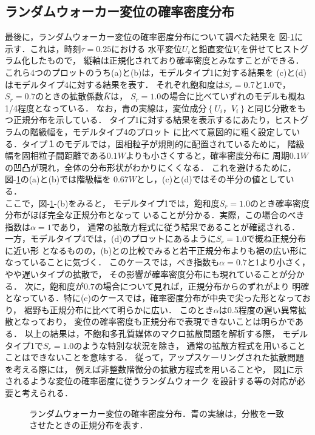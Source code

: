 \subsection{ランダムウォーカー変位の確率密度分布}
最後に，ランダムウォーカー変位の確率密度分布について調べた結果を
図-\ref{fig:fig10}に示す．これは，時刻$\tau=0.25$における
水平変位$U_i$と鉛直変位$V_i$を併せてヒストグラム化したもので，
縦軸は正規化されており確率密度とみなすことができる．
これら4つのプロットのうち(a)と(b)は，モデルタイプ1に対する結果を
(c)と(d)はモデルタイプ4に対する結果を表す．
それぞれ飽和度は$S_r=$0.7と1.0で，$S_r=0.7$のときの拡散係数$\bar K$は，
$S_r=1.0$の場合に比べていずれのモデルも概ね1/4程度となっている．
なお，青の実線は，変位成分$\left\{U_i，V_i\right\}$と同じ分散をもつ正規分布を示している．
タイプ1に対する結果を表示するにあたり，ヒストグラムの階級幅を，モデルタイプ4のプロット
に比べて意図的に粗く設定している．タイプ１のモデルでは，固相粒子が規則的に配置されているために，
階級幅を固相粒子間距離である$0.1W$よりも小さくすると，確率密度分布に
周期$0.1W$の凹凸が現れ，全体の分布形状がわかりにくくなる．
これを避けるために，図-\ref{fig:fig10}の(a)と(b)では階級幅を
0.67$W$とし，(c)と(d)ではその半分の値としている．\\
\hspace{\parindent}
ここで，図-\ref{fig:fig10}-(b)をみると，
モデルタイプ1では，飽和度$S_r=1.0$のとき確率密度分布がほぼ完全な正規分布となって
いることが分かる．実際，この場合のべき指数は$\alpha=1$であり，
通常の拡散方程式に従う結果であることが確認される．
一方，モデルタイプ4では，(d)のプロットにあるように$S_r=1.0$で概ね正規分布に近い形
となるものの，(b)との比較でみると若干正規分布よりも裾の広い形になっていることに気づく．
このケースでは，べき指数も$\alpha=0.7$と1より小さく，やや遅いタイプの拡散で，
その影響が確率密度分布にも現れていることが分かる．
次に，飽和度が$0.7$の場合について見れば，正規分布からのずれがより
明確となっている．特に(c)のケースでは，確率密度分布が中央で尖った形となっており，
裾野も正規分布に比べて明らかに広い．
このとき$\alpha$は0.5程度の遅い異常拡散となっており，
変位の確率密度も正規分布で表現できないことは明らかである．
以上の結果は，不飽和多孔質媒体のマクロ拡散問題を解析する際，
モデルタイプ1で$S_r=1.0$のような特別な状況を除き，
通常の拡散方程式を用いることことはできないことを意味する．
従って，アップスケーリングされた拡散問題を考える際には，
例えば非整数階微分の拡散方程式を用いることや，
図\ref{fig:fig10}に示されるような変位の確率密度に従うランダムウォーク
を設計する等の対応が必要と考えられる．
%
\begin{figure}[h]
\begin{center}
\caption{
	ランダムウォーカー変位の確率密度分布．青の実線は，分散を一致させたときの正規分布を表す．
	}
\label{fig:fig10}
\end{center}
\end{figure}

